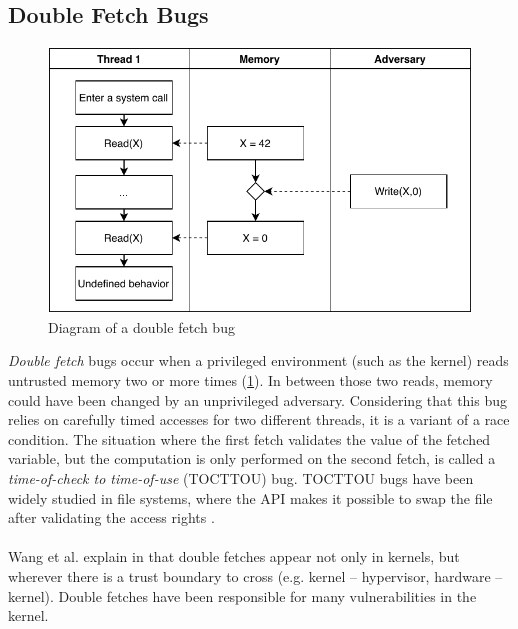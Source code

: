 \subsection{Double Fetch Bugs}

\label{subsec:doublefetch}

\begin{figure}[]
  \centering
  \includegraphics[width=.85\linewidth]{img/doublefetch.pdf}
  \caption{Diagram of a double fetch bug}
  \label{fig:doublefetch}
\end{figure}

\emph{Double fetch} bugs occur when a privileged environment (such as the 
kernel) reads untrusted memory two or more times (\cref{fig:doublefetch}). 
In between those two reads, memory could have been changed by an unprivileged
adversary. Considering that this bug relies on carefully timed accesses
for two different threads, it is a variant of a race condition. The situation
where the first fetch validates the value of the fetched variable, 
but the computation is only performed on the second fetch, is called a 
\emph{time-of-check to time-of-use} (TOCTTOU) bug. TOCTTOU bugs have been
widely studied in file systems, where the API makes it possible to swap the file
after validating the access rights \cite{payer2012protecting,
pu2006methodical, wei2010modeling, tsafrir2008portably}.
\\
\\
Wang et al. explain in \cite{wang2018survey} that double fetches appear not only
in kernels, but wherever there is a trust boundary to cross (e.g. kernel -- 
hypervisor, hardware -- kernel). Double fetches have been responsible for many
vulnerabilities in the kernel.


